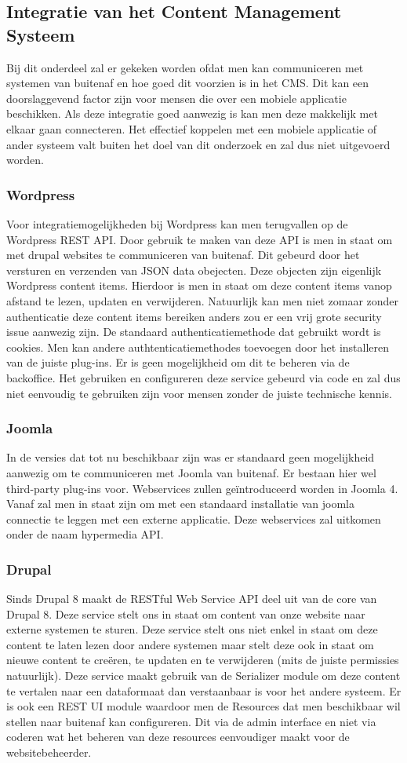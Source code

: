\subsection{Integratie van het Content Management Systeem}
Bij dit onderdeel zal er gekeken worden ofdat men kan communiceren met systemen van buitenaf en hoe goed dit voorzien is in het CMS. Dit kan een doorslaggevend factor zijn voor mensen die over een mobiele applicatie beschikken. Als deze integratie goed aanwezig is kan men deze makkelijk met elkaar gaan connecteren. Het effectief koppelen met een mobiele applicatie of ander systeem valt buiten het doel van dit onderzoek en zal dus niet uitgevoerd worden.
\subsubsection{Wordpress}
Voor integratiemogelijkheden bij Wordpress kan men terugvallen op de Wordpress REST API. Door gebruik te maken van deze API is men in staat om met drupal websites te communiceren van buitenaf. Dit gebeurd door het versturen en verzenden van JSON data obejecten. Deze objecten zijn eigenlijk Wordpress content items. Hierdoor is men in staat om deze content items vanop afstand te lezen, updaten en verwijderen. Natuurlijk kan men niet zomaar zonder authenticatie deze content items bereiken anders zou er een vrij grote security issue aanwezig zijn. De standaard authenticatiemethode dat gebruikt wordt is cookies. Men kan andere authtenticatiemethodes toevoegen door het installeren van de juiste plug-ins. Er is geen mogelijkheid om dit te beheren via de backoffice. Het gebruiken en configureren deze service gebeurd via code en zal dus niet eenvoudig te gebruiken zijn voor mensen zonder de juiste technische kennis.
\subsubsection{Joomla}
In de versies dat tot nu beschikbaar zijn was er standaard geen mogelijkheid aanwezig om te communiceren met Joomla van buitenaf. Er bestaan hier wel third-party plug-ins voor. Webservices zullen geïntroduceerd worden in Joomla 4. Vanaf zal men in staat zijn om met een standaard installatie van joomla connectie te leggen met een externe applicatie. Deze webservices zal uitkomen onder de naam hypermedia API.
\subsubsection{Drupal}
Sinds Drupal 8 maakt de RESTful Web Service API deel uit van de core van Drupal 8. Deze service stelt ons in staat om content van onze website naar externe systemen te sturen. Deze service stelt ons niet enkel in staat om deze content te laten lezen door andere systemen maar stelt deze ook in staat om nieuwe content te creëren, te updaten en te verwijderen (mits de juiste permissies natuurlijk). Deze service maakt gebruik van de Serializer module om deze content te vertalen naar een dataformaat dan verstaanbaar is voor het andere systeem. Er is ook een REST UI module waardoor men de Resources dat men beschikbaar wil stellen naar buitenaf kan configureren. Dit via de admin interface en niet via coderen wat het beheren van deze resources eenvoudiger maakt voor de websitebeheerder.

